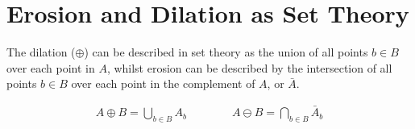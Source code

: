%
%

\section{Erosion and Dilation as Set Theory}
The dilation ($\oplus$) can be described in set theory as the union of all
points $b \in B$ over each point in $A$, whilst erosion can be described by
the intersection of all points $b \in B$ over each point in the complement of
$A$, or $\bar{A}$.

\begin{align}
    A \oplus B = \bigcup_{b \in B} A_{b}
    \qquad\qquad
    A \ominus B = \bigcap_{b \in B} \bar{A}_{b}
\end{align}
